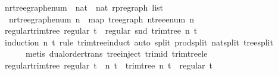\begin{isabellebody}
%
\endisadelimproof
\isanewline
{}\isamarkupfalse%
\ n{\isacharunderscore}{\kern0pt}rtree{\isacharunderscore}{\kern0pt}graph{\isacharunderscore}{\kern0pt}enum\ {\isacharcolon}{\kern0pt}{\isacharcolon}{\kern0pt}\ {\isachardoublequoteopen}nat\ {\isasymRightarrow}\ nat\ rpregraph\ list{\isachardoublequoteclose}\ \isanewline
\ \ {\isachardoublequoteopen}n{\isacharunderscore}{\kern0pt}rtree{\isacharunderscore}{\kern0pt}graph{\isacharunderscore}{\kern0pt}enum\ n\ {\isacharequal}{\kern0pt}\ map\ tree{\isacharunderscore}{\kern0pt}graph\ {\isacharparenleft}{\kern0pt}n{\isacharunderscore}{\kern0pt}tree{\isacharunderscore}{\kern0pt}enum\ n{\isacharparenright}{\kern0pt}{\isachardoublequoteclose}%
\isadelimdocument
%
\endisadelimdocument
%
\isatagdocument
%
\isamarkuptrue%
%
\endisatagdocument
{\isafolddocument}%
%
\isadelimdocument
%
\endisadelimdocument
{}\isamarkupfalse%
\ regular{\isacharunderscore}{\kern0pt}trim{\isacharunderscore}{\kern0pt}tree{\isacharcolon}{\kern0pt}\ {\isachardoublequoteopen}regular\ t\ {\isasymLongrightarrow}\ regular\ {\isacharparenleft}{\kern0pt}snd\ {\isacharparenleft}{\kern0pt}trim{\isacharunderscore}{\kern0pt}tree\ n\ t{\isacharparenright}{\kern0pt}{\isacharparenright}{\kern0pt}{\isachardoublequoteclose}\ \isanewline
%
\isadelimproof
\ \ %
\endisadelimproof
%
\isatagproof
{}\isamarkupfalse%
\ {\isacharparenleft}{\kern0pt}induction\ n\ t\ rule{\isacharcolon}{\kern0pt}\ trim{\isacharunderscore}{\kern0pt}tree{\isachardot}{\kern0pt}induct{\isacharcomma}{\kern0pt}\ auto\ split{\isacharcolon}{\kern0pt}\ prod{\isachardot}{\kern0pt}split\ nat{\isachardot}{\kern0pt}split\ tree{\isachardot}{\kern0pt}split{\isacharcomma}{\kern0pt}\isanewline
\ \ \ \ \ \ metis\ dual{\isacharunderscore}{\kern0pt}order{\isachardot}{\kern0pt}trans\ tree{\isachardot}{\kern0pt}inject\ trim{\isacharunderscore}{\kern0pt}id\ trim{\isacharunderscore}{\kern0pt}tree{\isacharunderscore}{\kern0pt}le{\isacharparenright}{\kern0pt}%
\endisatagproof
{\isafoldproof}%
%
\isadelimproof
\isanewline
%
\endisadelimproof
\isanewline
{}\isamarkupfalse%
\ regular{\isacharunderscore}{\kern0pt}trim{\isacharunderscore}{\kern0pt}tree{\isacharprime}{\kern0pt}{\isacharcolon}{\kern0pt}\ {\isachardoublequoteopen}regular\ t\ {\isasymLongrightarrow}\ {\isacharparenleft}{\kern0pt}n{\isacharprime}{\kern0pt}{\isacharcomma}{\kern0pt}\ t{\isacharprime}{\kern0pt}{\isacharparenright}{\kern0pt}\ {\isacharequal}{\kern0pt}\ trim{\isacharunderscore}{\kern0pt}tree\ n\ t\ {\isasymLongrightarrow}\ regular\ t{\isacharprime}{\kern0pt}{\isachardoublequoteclose}\isanewline

\end{isabellebody}

